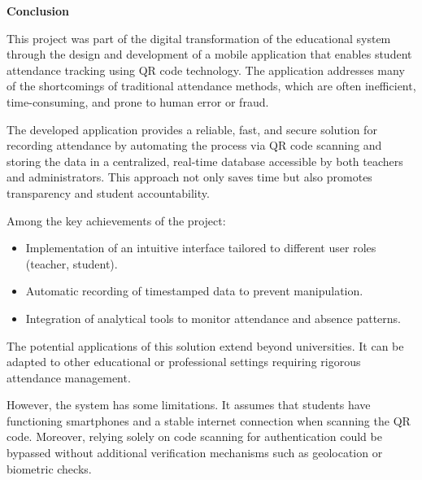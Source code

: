 \documentclass[12pt,a4paper]{report}
\begin{document}
\newpage
\begin{tcolorbox}[
    colback=mintgreen!20, 
    colframe=mintgreen!80!black, 
    width=\textwidth, 
    boxrule=1pt, 
    arc=5pt, 
    auto outer arc,
    left=10pt,
    right=10pt,
    top=6pt,
    bottom=6pt
]
    \centering
    \Large \textbf{Conclusion}
\end{tcolorbox}

\vspace{0.5cm} %


This project was part of the digital transformation of the educational system through the design and development of a mobile application that enables student attendance tracking using QR code technology. The application addresses many of the shortcomings of traditional attendance methods, which are often inefficient, time-consuming, and prone to human error or fraud.

The developed application provides a reliable, fast, and secure solution for recording attendance by automating the process via QR code scanning and storing the data in a centralized, real-time database accessible by both teachers and administrators. This approach not only saves time but also promotes transparency and student accountability.

Among the key achievements of the project:
\begin{itemize}
  \item Implementation of an intuitive interface tailored to different user roles (teacher, student).
  \item Automatic recording of timestamped data to prevent manipulation.
  \item Integration of analytical tools to monitor attendance and absence patterns.
\end{itemize}

The potential applications of this solution extend beyond universities. It can be adapted to other educational or professional settings requiring rigorous attendance management.

However, the system has some limitations. It assumes that students have functioning smartphones and a stable internet connection when scanning the QR code. Moreover, relying solely on code scanning for authentication could be bypassed without additional verification mechanisms such as geolocation or biometric checks.
\end{document}
